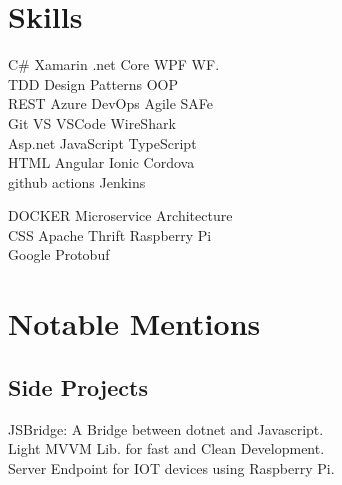 \documentclass[]{shrikant-resume-openfont}
\begin{document}
\begin{minipage}[t]{0.33\textwidth}
\section{Skills}
\vspace{1mm}
\textbullet{} C\# \textbullet{} Xamarin \textbullet{} .net Core
\textbullet{} WPF \textbullet{} WF.\\
\vspace{1mm}
\textbullet{} TDD \textbullet{} Design Patterns \textbullet{} OOP\\ 
\vspace{1mm}
\textbullet{} REST \textbullet{} Azure DevOps 
\textbullet{} Agile \textbullet{} SAFe\\
\vspace{1mm}
\textbullet{} Git \textbullet{} VS \textbullet{} VSCode \textbullet{} WireShark \\
\vspace{1mm}
\textbullet{} Asp.net \textbullet{} JavaScript \textbullet{} TypeScript\\
\vspace{1mm}
\textbullet{} HTML \textbullet{} Angular \textbullet{} Ionic \textbullet{} Cordova\\
\vspace{1mm}
\textbullet{} github actions \textbullet{} Jenkins

\vspace{\topsep}

\vspace{1mm}
\textbullet{} DOCKER \textbullet{} Microservice Architecture\\
\vspace{1mm}
\textbullet{} CSS \textbullet{} Apache Thrift \textbullet{} Raspberry Pi\\
\vspace{1mm}
\textbullet{} Google Protobuf

\vspace{\topsep}


\section{Notable Mentions}
\vspace{1mm}
\subsection{Side Projects}
\vspace{1mm}
\textbullet{} JSBridge: A Bridge between dotnet and Javascript.\\
\vspace{1mm}
\textbullet{} Light MVVM Lib. for fast and Clean Development.\\
\vspace{1mm}
\textbullet{} Server Endpoint for IOT devices using Raspberry Pi.\\
\sectionsep


\end{minipage}
\end{document}
